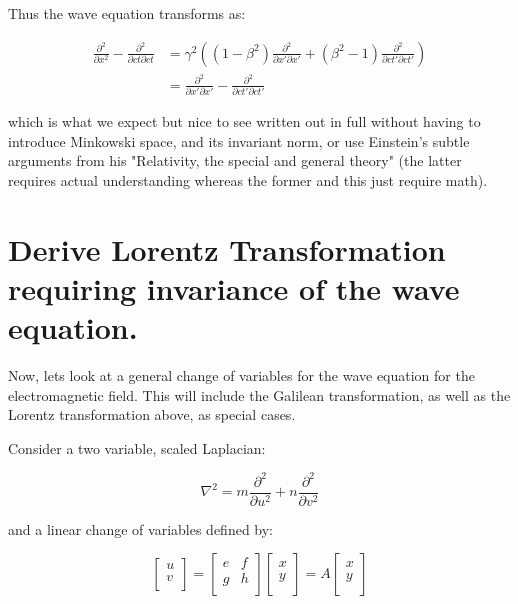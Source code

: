 \documentclass{article}      %
\newcommand{\laplacian}[0]{\nabla^2}
\begin{document}
Thus the wave equation transforms as:

\begin{align*}
\frac{\partial^2}{\partial x^2} - \frac{\partial^2}{\partial ct \partial ct}
&=
\gamma^2
\left(
(1 - \beta^2) \frac{\partial^2}{\partial x'\partial x'} + (\beta^2 -1)\frac{\partial^2}{\partial c t'\partial c t'}
\right) \\
&=
\frac{\partial^2}{\partial x'\partial x'} - \frac{\partial^2}{\partial c t'\partial c t'}
\end{align*}

which is what we expect but nice to see written out in full without having to introduce Minkowski space, and its invariant norm,
or use Einstein's subtle arguments from his "Relativity, the special and general theory" (the latter requires actual understanding
whereas the former and this just require math).

\section{ Derive Lorentz Transformation requiring invariance of the wave equation. }

Now, lets look at a general change of variables for the wave equation for the electromagnetic field.  This will include
the Galilean transformation, as well as the Lorentz transformation above, as special cases.

Consider a two variable, scaled Laplacian:

\begin{equation}
\laplacian = m \frac{\partial^2}{\partial u^2} + n \frac{\partial^2}{\partial v^2}
\end{equation}

and a linear change of variables defined by:

\begin{equation}
\begin{bmatrix}
u \\
v \\
\end{bmatrix}
=
\begin{bmatrix}
e & f \\
g & h \\
\end{bmatrix}
\begin{bmatrix}
x \\
y \\
\end{bmatrix}
=
A
\begin{bmatrix}
x \\
y \\
\end{bmatrix}
\end{equation}
\end{document}
